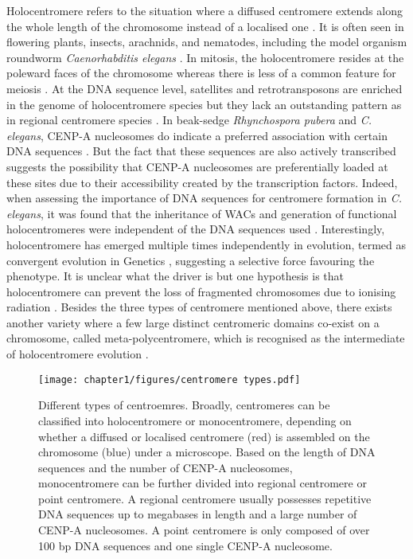 Holocentromere refers to the situation where a diffused centromere extends along the whole length of the chromosome instead of a localised one \citep{Guerra2010NeocentricsRules}. It is often seen in flowering plants, insects, arachnids, and nematodes, including the model organism roundworm \textit{Caenorhabditis elegans} \citep{Wong2020LessonsChromosomes}. In mitosis, the holocentromere resides at the poleward faces of the chromosome whereas there is less of a common feature for meiosis \citep{Maddox2004HoloerElegans, Buchwitz1999AElegans, Marques2016HolocentromereHolocentromeres}. At the DNA sequence level, satellites and retrotransposons are enriched in the genome of holocentromere species but they lack an outstanding pattern as in regional centromere species \citep{Kang2016DifferentialElimination, Heckmann2013TheOrganization, Marques2016RestructuringPubera}. In beak-sedge \textit{Rhynchospora pubera} and \textit{C. elegans}, CENP-A nucleosomes do indicate a preferred association with certain DNA sequences \citep{Marques2016HolocentromereHolocentromeres, Gassmann2012AnElegans, Steiner2014HolocentromeresHotspots}. But the fact that these sequences are also actively transcribed suggests the possibility that CENP-A nucleosomes are preferentially loaded at these sites due to their accessibility created by the transcription factors. Indeed, when assessing the importance of DNA sequences for centromere formation in \textit{C. elegans}, it was found that the inheritance of WACs and generation of functional holocentromeres were independent of the DNA sequences used \citep{Stinchcomb1985ExtrachromosomalElegans, Yuen2011RapidEmbryos}. Interestingly, holocentromere has emerged multiple times independently in evolution, termed as convergent evolution in Genetics \citep{Guerra2019MonocentricFamily, Drinnenberg2014RecurrentInsects, Melters2012HolocentricAnalysis}, suggesting a selective force favouring the phenotype. It is unclear what the driver is but one hypothesis is that holocentromere can prevent the loss of fragmented chromosomes due to ionising radiation \citep{Zedek2018HolocentricLand}. Besides the three types of centromere mentioned above, there exists another variety where a few large distinct centromeric domains co-exist on a chromosome, called meta-polycentromere, which is recognised as the intermediate of holocentromere evolution \citep{Neumann2012StretchingDomains}. 

\begin{figure}[htbp]
  \centering
  \texttt{[image: chapter1/figures/centromere types.pdf]}
  \caption[Different types of centroemres]{Different types of centroemres. Broadly, centromeres can be classified into holocentromere or monocentromere, depending on whether a diffused or localised centromere (red) is assembled on the chromosome (blue) under a microscope. Based on the length of DNA sequences and the number of CENP-A nucleosomes, monocentromere can be further divided into regional centromere or point centromere. A regional centromere usually possesses repetitive DNA sequences up to megabases in length and a large number of CENP-A nucleosomes. A point centromere is only composed of over 100 bp DNA sequences and one single CENP-A nucleosome. }
  \label{fig:cenTypes}
\end{figure}

